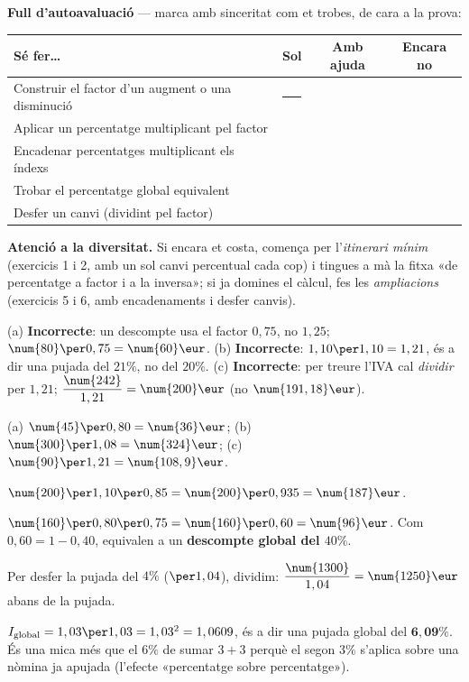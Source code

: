 \begin{idea}
\textbf{Full d'autoavaluació} — marca amb sinceritat com et trobes, de cara a la prova:
\begin{center}
\renewcommand{\arraystretch}{1.4}
\begin{tabular}{p{8.2cm} c c c}
\toprule
\textbf{Sé fer\dots} & \textbf{Sol} & \textbf{Amb ajuda} & \textbf{Encara no} \\
\midrule
Construir el factor d'un augment o una disminució & \rule{0.7cm}{0pt} & & \\
Aplicar un percentatge multiplicant pel factor & & & \\
Encadenar percentatges multiplicant els índexs & & & \\
Trobar el percentatge global equivalent & & & \\
Desfer un canvi (dividint pel factor) & & & \\
\bottomrule
\end{tabular}
\end{center}
\end{idea}

\noindent\textbf{Atenció a la diversitat.} Si encara et costa, comença per
l'\emph{itinerari mínim} (exercicis 1 i 2, amb un sol canvi percentual cada cop) i
tingues a mà la fitxa «de percentatge a factor i a la inversa»; si ja domines el
càlcul, fes les \emph{ampliacions} (exercicis 5 i 6, amb encadenaments i desfer canvis).

\begin{solucions}
\begin{sollist}
  \item (a) \textbf{Incorrecte}: un descompte usa el factor $0,75$, no $1,25$;
        $\num{80}\per 0,75=\num{60}\eur$. \quad
        (b) \textbf{Incorrecte}: $1,10\per 1,10=1,21$, és a dir una pujada del $21\%$,
        no del $20\%$. \quad
        (c) \textbf{Incorrecte}: per treure l'IVA cal \emph{dividir} per $1,21$;
        $\dfrac{\num{242}}{1,21}=\num{200}\eur$ (no $\num{191,18}\eur$).
  \item (a) $\num{45}\per 0,80=\num{36}\eur$; \quad
        (b) $\num{300}\per 1,08=\num{324}\eur$; \quad
        (c) $\num{90}\per 1,21=\num{108,9}\eur$.
  \item $\num{200}\per 1,10\per 0,85=\num{200}\per 0,935=\num{187}\eur$.
  \item $\num{160}\per 0,80\per 0,75=\num{160}\per 0,60=\num{96}\eur$. Com
        $0,60=1-0,40$, equivalen a un \textbf{descompte global del $40\%$}.
  \item Per desfer la pujada del $4\%$ ($\per 1,04$), dividim:
        $\dfrac{\num{1300}}{1,04}=\num{1250}\eur$ abans de la pujada.
  \item $I_{\text{global}}=1,03\per 1,03=1,03^2=1,0609$, és a dir una pujada global del
        $\mathbf{6,09\%}$. És una mica més que el $6\%$ de sumar $3+3$ perquè el segon
        $3\%$ s'aplica sobre una nòmina ja apujada (l'efecte «percentatge sobre
        percentatge»).
\end{sollist}
\end{solucions}
